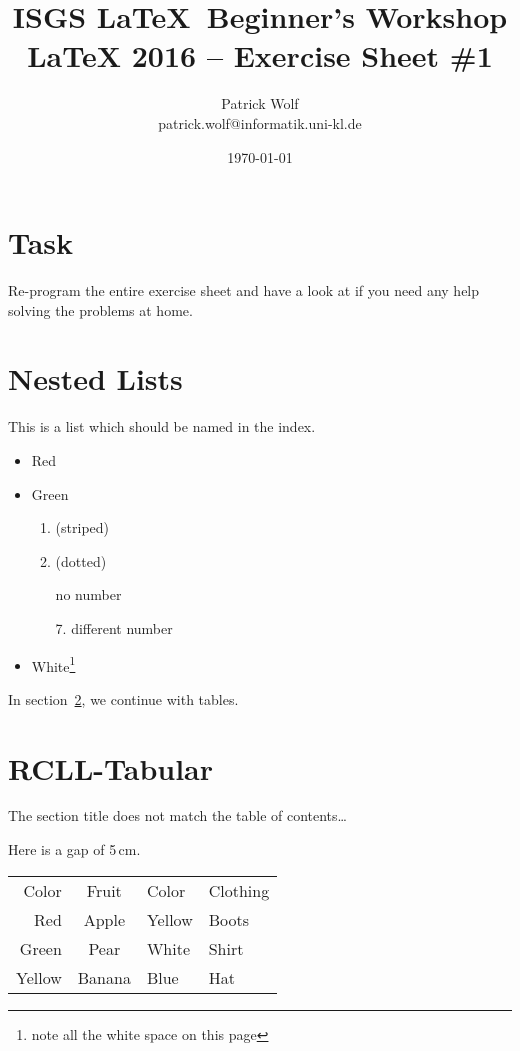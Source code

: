 \documentclass[a4paper,10pt]{article}
\title{ISGS \LaTeX~Beginner's Workshop \\\LaTeX{} 2016 -- Exercise Sheet \#1}
\author{Patrick Wolf \\
patrick.wolf@informatik.uni-kl.de}
\date{\today}
\begin{document}
\maketitle

\tableofcontents

\newpage

\section*{Task}
Re-program the entire exercise sheet and have a look at \cite{wikibooks.org-Latex} if you need any help solving the problems at home.

\section{Nested Lists}

This is a list which should be named in the index.
\begin{itemize}
	\item Red
	\item Green
		\begin{enumerate}
			\item (striped)
			\item (dotted)
			\item[] no number
			\item[7.] different number
		\end{enumerate}
	\item White\footnote{note all the white space on this page}
\end{itemize}

In section~\ref{sec:rclltab}, we continue with tables.

\clearpage
\section[RLLC-Tabular]{RCLL-Tabular}
\label{sec:rclltab}

The section title does not match the table of contents\dots

Here is a gap of 5\,cm.
\vspace{5cm}

\begin{tabular}{rcll}
Color & Fruit & Color & Clothing\\[2mm]
Red & Apple & Yellow & Boots\\
Green & Pear & White & Shirt\\
Yellow & Banana & Blue & Hat\\
\end{tabular}
\end{document}
